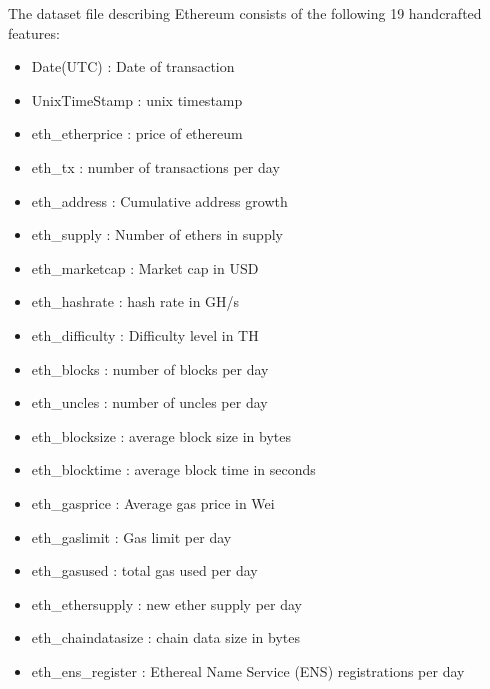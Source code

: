 \documentclass{article}
\begin{document}
The dataset file describing Ethereum consists of the following 19 handcrafted features:
\begin{itemize}
    \item Date(UTC) : Date of transaction
    \item UnixTimeStamp : unix timestamp
    \item eth\_etherprice : price of ethereum
    \item eth\_tx : number of transactions per day
    \item eth\_address : Cumulative address growth
    \item eth\_supply : Number of ethers in supply
    \item eth\_marketcap : Market cap in USD
    \item eth\_hashrate : hash rate in GH/s
    \item eth\_difficulty : Difficulty level in TH
    \item eth\_blocks : number of blocks per day
    \item eth\_uncles : number of uncles per day
    \item eth\_blocksize : average block size in bytes
    \item eth\_blocktime : average block time in seconds
    \item eth\_gasprice : Average gas price in Wei
    \item eth\_gaslimit : Gas limit per day
    \item eth\_gasused : total gas used per day
    \item eth\_ethersupply : new ether supply per day
    \item eth\_chaindatasize : chain data size in bytes
    \item eth\_ens\_register : Ethereal Name Service (ENS) registrations per day
\end{itemize}
\end{document}
